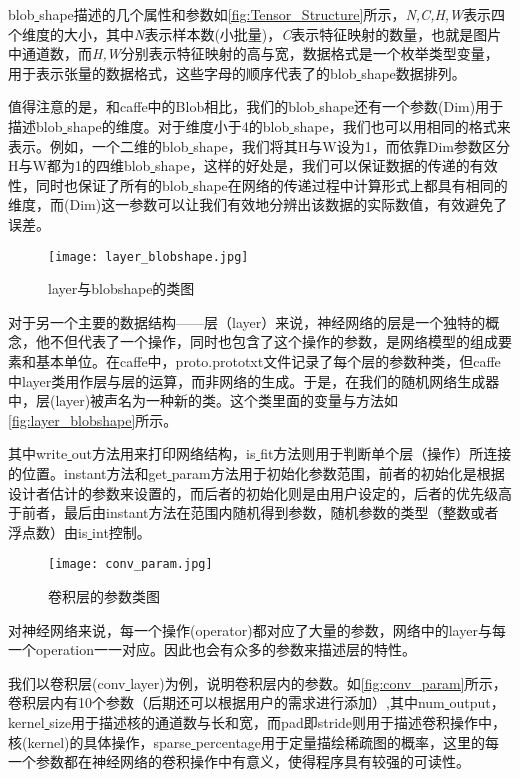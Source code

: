 blob\underline{ }shape描述的几个属性和参数如\autoref{fig:Tensor_Structure}所示，\emph{N,C,H,W}表示四个维度的大小，其中\emph{N}表示样本数(小批量)，\emph{C}表示特征映射的数量，也就是图片中通道数，而\emph{H,W}分别表示特征映射的高与宽，数据格式是一个枚举类型变量，用于表示张量的数据格式，这些字母的顺序代表了的blob\underline{ }shape数据排列。

值得注意的是，和caffe中的Blob相比，我们的blob\underline{ }shape还有一个参数(Dim)用于描述blob\underline{ }shape的维度。对于维度小于4的blob\underline{ }shape，我们也可以用相同的格式来表示。例如，一个二维的blob\underline{ }shape，我们将其H与W设为1，而依靠Dim参数区分H与W都为1的四维blob\underline{ }shape，这样的好处是，我们可以保证数据的传递的有效性，同时也保证了所有的blob\underline{ }shape在网络的传递过程中计算形式上都具有相同的维度，而(Dim)这一参数可以让我们有效地分辨出该数据的实际数值，有效避免了误差。

\begin{figure}[!htbp]
\centering
\texttt{[image: layer\_blobshape.jpg]}
\caption{layer与blobshape的类图}
\label{fig:layer_blobshape}
\end{figure}

对于另一个主要的数据结构——层（layer）来说，神经网络的层是一个独特的概念，他不但代表了一个操作，同时也包含了这个操作的参数，是网络模型的组成要素和基本单位。在caffe中，proto.prototxt文件记录了每个层的参数种类，但caffe中layer类用作层与层的运算，而非网络的生成。于是，在我们的随机网络生成器中，层(layer)被声名为一种新的类。这个类里面的变量与方法如\autoref{fig:layer_blobshape}所示。

其中write\underline{ }out方法用来打印网络结构，is\underline{ }fit方法则用于判断单个层（操作）所连接的位置。instant方法和get\underline{ }param方法用于初始化参数范围，前者的初始化是根据设计者估计的参数来设置的，而后者的初始化则是由用户设定的，后者的优先级高于前者，最后由instant方法在范围内随机得到参数，随机参数的类型（整数或者浮点数）由is\underline{ }int控制。

\begin{figure}[!htbp]
\centering
\texttt{[image: conv\_param.jpg]}
\caption{卷积层的参数类图}
\label{fig:conv_param}
\end{figure}
对神经网络来说，每一个操作(operator)都对应了大量的参数，网络中的layer与每一个operation一一对应。因此也会有众多的参数来描述层的特性。

我们以卷积层(conv\underline{ }layer)为例，说明卷积层内的参数。如\autoref{fig:conv_param}所示，卷积层内有10个参数（后期还可以根据用户的需求进行添加）,其中num\underline{ }output，kernel\underline{ }size用于描述核的通道数与长和宽，而pad即stride则用于描述卷积操作中，核(kernel)的具体操作，sparse\underline{ }percentage用于定量描绘稀疏图的概率，这里的每一个参数都在神经网络的卷积操作中有意义，使得程序具有较强的可读性。

